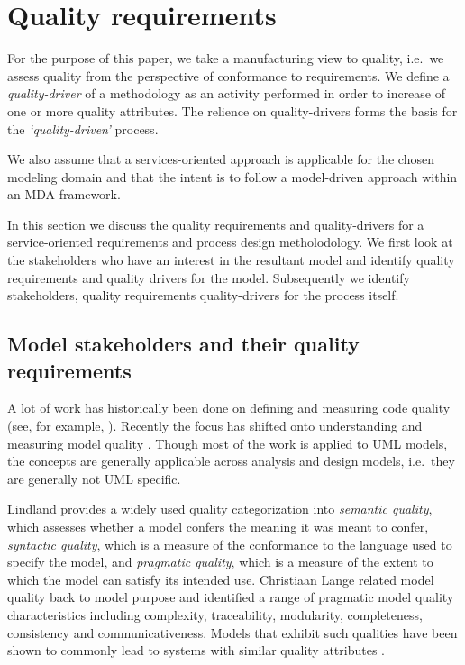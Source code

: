 \section{Quality requirements}
\label{sec:qualityRequirements}

For the purpose of this paper, we take a manufacturing view \cite{garvin_what_1984} to quality, i.e.\ we assess quality from the perspective of conformance to requirements. We define a \emph{quality-driver} of a methodology as an activity performed in order to increase of one or more quality attributes. The relience on quality-drivers forms the basis for the \emph{`quality-driven'} process.

We also assume that a services-oriented approach is applicable for the chosen modeling domain and that the intent is to follow a model-driven approach within an MDA framework.

In this section we discuss the quality requirements and quality-drivers for a service-oriented requirements and process design metholodology. We first look at the stakeholders who have an interest in the resultant model and identify quality requirements and quality drivers for the model. Subsequently we identify stakeholders, quality requirements quality-drivers for the process itself.


\subsection{Model stakeholders and their quality requirements}
\label{sec:modelStakeholdersAndQualityRequirements}

A lot of work has historically been done on defining and measuring code quality (see, for example, \cite{boehm_barry_w._characteristics_1978}). Recently the focus has shifted onto understanding and measuring model quality \cite{lange_managing_2005,lange_improving_2006,shim_design_2008,qi_yu-dong_analysis_2010}. Though most of the work is applied to UML models, the concepts are generally applicable across analysis and design models, i.e.\ they are generally not UML specific. 

Lindland\cite{lindland_understanding_1994} provides a widely used quality categorization into \emph{semantic quality}, which assesses whether a model confers the meaning it was meant to confer, \emph{syntactic quality}, which is a measure of the conformance to the language used to specify the model, and \emph{pragmatic quality}, which is a measure of the extent to which the model can satisfy its intended use. Christiaan Lange  \cite{lange_christiaan_assessing_2007} related model quality back to model purpose and identified a range of pragmatic model quality characteristics including complexity, traceability, modularity, completeness, consistency and communicativeness. Models that exhibit such qualities have been shown to commonly lead to systems with similar quality attributes \cite{podgorelec_estimating_2007}.

